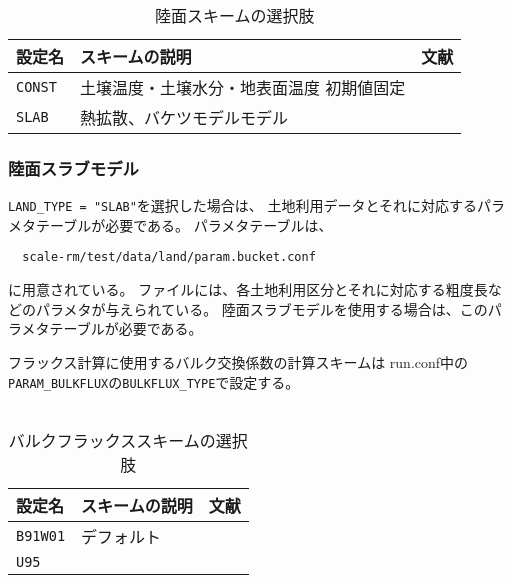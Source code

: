 \begin{table}[h]
\begin{center}
  \caption{陸面スキームの選択肢}
  \label{tab:nml_land}
  \begin{tabularx}{150mm}{llX} \hline
    \rowcolor[gray]{0.9}  設定名 & スキームの説明 & 文献\\ \hline
      \verb|CONST| & 土壌温度・土壌水分・地表面温度 初期値固定 &  \\
      \verb|SLAB|  & 熱拡散、バケツモデルモデル   &  \\
    \hline
  \end{tabularx}
\end{center}
\end{table}



\subsubsection{陸面スラブモデル}
\verb|LAND_TYPE = "SLAB"|を選択した場合は、
土地利用データとそれに対応するパラメタテーブルが必要である。
パラメタテーブルは、
\begin{verbatim}
  scale-rm/test/data/land/param.bucket.conf
\end{verbatim}
に用意されている。
ファイルには、各土地利用区分とそれに対応する粗度長などのパラメタが与えられている。
陸面スラブモデルを使用する場合は、このパラメタテーブルが必要である。


フラックス計算に使用するバルク交換係数の計算スキームは 
run.conf中の\verb|PARAM_BULKFLUX|の\verb|BULKFLUX_TYPE|で設定する。\\

\\

\begin{table}[h]
\begin{center}
  \caption{バルクフラックススキームの選択肢}
  \label{tab:nml_bulk}
  \begin{tabularx}{150mm}{llX} \hline
    \rowcolor[gray]{0.9}  設定名 & スキームの説明 & 文献\\ \hline
      \verb|B91W01| & デフォルト & \citet{beljaars_1991,wilson_2001}\\
      \verb|U95|    &            & \citet{uno_1995}\\
    \hline
  \end{tabularx}
\end{center}
\end{table}




